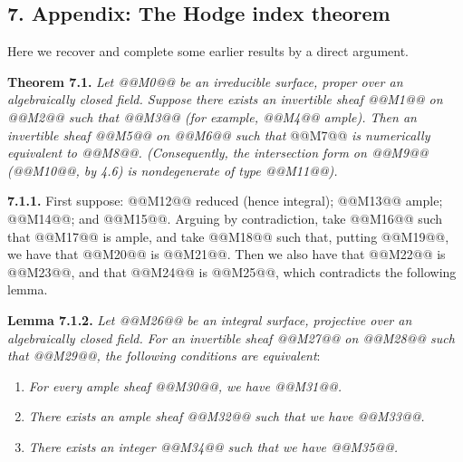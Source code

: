 \subsection*{7. Appendix: The Hodge index theorem}

Here we recover and complete some earlier results by a direct argument.

\textbf{Theorem 7.1.} \emph{Let @@M0@@ be an irreducible surface, proper over an algebraically closed field. Suppose there exists an invertible sheaf @@M1@@ on @@M2@@ such that @@M3@@ (for example, @@M4@@ ample). Then an invertible sheaf @@M5@@ on @@M6@@ such that}
@@M7@@
\emph{is numerically equivalent to @@M8@@. (Consequently, the intersection form on @@M9@@ (@@M10@@, by 4.6) is nondegenerate of type @@M11@@).}

\textbf{7.1.1.} First suppose: @@M12@@ reduced (hence integral); @@M13@@ ample; @@M14@@; and @@M15@@. Arguing by contradiction, take @@M16@@ such that @@M17@@ is ample, and take @@M18@@ such that, putting @@M19@@, we have that @@M20@@ is @@M21@@. Then we also have that @@M22@@ is @@M23@@, and that @@M24@@ is @@M25@@, which contradicts the following lemma.

\textbf{Lemma 7.1.2.} \emph{Let @@M26@@ be an integral surface, projective over an algebraically closed field. For an invertible sheaf @@M27@@ on @@M28@@ such that @@M29@@, the following conditions are equivalent}:
\begin{enumerate}[label=(\roman*)]
\item \emph{For every ample sheaf @@M30@@, we have @@M31@@.}
\item[(i')] \emph{There exists an ample sheaf @@M32@@ such that we have @@M33@@.}
\item \emph{There exists an integer @@M34@@ such that we have @@M35@@.}
\end{enumerate}

